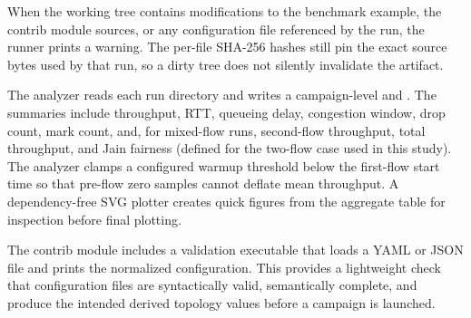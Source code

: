 When the working tree contains modifications to the benchmark example, the contrib module sources, or any configuration file referenced by the run, the runner prints a warning. The per-file SHA-256 hashes still pin the exact source bytes used by that run, so a dirty tree does not silently invalidate the artifact.

The analyzer reads each run directory and writes a campaign-level \SummaryCsv{} and \SummaryAggregateCsv{}. The summaries include throughput, RTT, queueing delay, congestion window, drop count, mark count, and, for mixed-flow runs, second-flow throughput, total throughput, and Jain fairness (defined for the two-flow case used in this study). The analyzer clamps a configured warmup threshold below the first-flow start time so that pre-flow zero samples cannot deflate mean throughput. A dependency-free SVG plotter creates quick figures from the aggregate table for inspection before final plotting.

The contrib module includes a validation executable that loads a YAML or JSON file and prints the normalized configuration. This provides a lightweight check that configuration files are syntactically valid, semantically complete, and produce the intended derived topology values before a campaign is launched.

